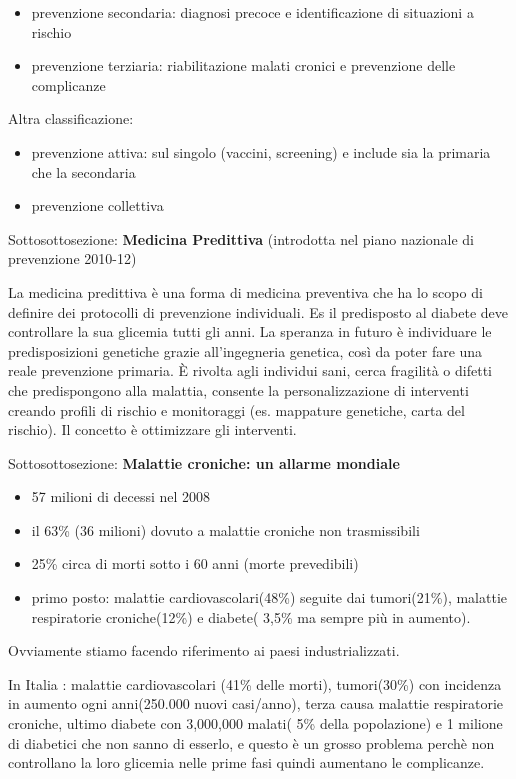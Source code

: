 \documentclass[]{article}
\begin{document}
\begin{itemize}
\item
  prevenzione secondaria: diagnosi precoce e identificazione di
  situazioni a rischio
\item
  prevenzione terziaria: riabilitazione malati cronici e prevenzione
  delle complicanze
\end{itemize}

Altra classificazione:

\begin{itemize}
\item
  prevenzione attiva: sul singolo (vaccini, screening) e include sia la
  primaria che la secondaria
\item
  prevenzione collettiva
\end{itemize}

Sottosottosezione: \textbf{Medicina Predittiva} (introdotta nel piano
nazionale di prevenzione 2010-12)

La medicina predittiva è una forma di medicina preventiva che ha lo
scopo di definire dei protocolli di prevenzione individuali. Es il
predisposto al diabete deve controllare la sua glicemia tutti gli anni.
La speranza in futuro è individuare le predisposizioni genetiche grazie
all'ingegneria genetica, così da poter fare una reale prevenzione
primaria. È rivolta agli individui sani, cerca fragilità o difetti che
predispongono alla malattia, consente la personalizzazione di interventi
creando profili di rischio e monitoraggi (es. mappature genetiche, carta
del rischio). Il concetto è ottimizzare gli interventi.

Sottosottosezione: \textbf{Malattie croniche: un allarme mondiale}

\begin{itemize}
\item
  57 milioni di decessi nel 2008
\item
  il 63\% (36 milioni) dovuto a malattie croniche non trasmissibili
\item
  25\% circa di morti sotto i 60 anni (morte prevedibili)
\item
  primo posto: malattie cardiovascolari(48\%) seguite dai tumori(21\%),
  malattie respiratorie croniche(12\%) e diabete( 3,5\% ma sempre più in
  aumento).
\end{itemize}

Ovviamente stiamo facendo riferimento ai paesi industrializzati.

In Italia : malattie cardiovascolari (41\% delle morti), tumori(30\%)
con incidenza in aumento ogni anni(250.000 nuovi casi/anno), terza causa
malattie respiratorie croniche, ultimo diabete con 3,000,000 malati( 5\%
della popolazione) e 1 milione di diabetici che non sanno di esserlo, e
questo è un grosso problema perchè non controllano la loro glicemia
nelle prime fasi quindi aumentano le complicanze.
\end{document}
